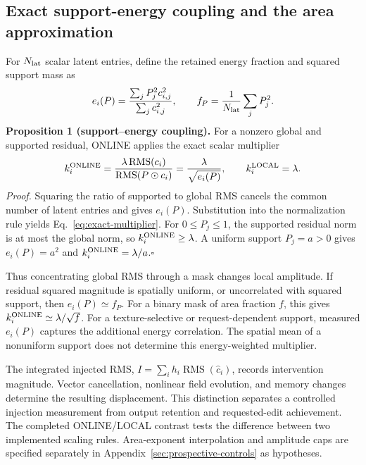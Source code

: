 \documentclass[conference]{IEEEtran}
\newcommand{\RMS}{\operatorname{RMS}}
\begin{document}
\subsection{Exact support-energy coupling and the area approximation}
For $N_{\rm lat}$ scalar latent entries, define the retained energy fraction and squared support mass as
\begin{equation}
 e_i(P)=\frac{\sum_j P_j^2c_{i,j}^2}{\sum_j c_{i,j}^2},\qquad
 f_P=\frac{1}{N_{\rm lat}}\sum_jP_j^2.
\label{eq:support-energy}
\end{equation}
\textbf{Proposition 1 (support--energy coupling).} For a nonzero global and supported residual, ONLINE applies the exact scalar multiplier
\begin{equation}
 k_i^{\rm ONLINE}=\frac{\lambda\RMS(c_i)}{\RMS(P\odot c_i)}=\frac{\lambda}{\sqrt{e_i(P)}},
 \qquad k_i^{\rm LOCAL}=\lambda.
\label{eq:exact-multiplier}
\end{equation}
\emph{Proof.} Squaring the ratio of supported to global RMS cancels the common number of latent entries and gives $e_i(P)$. Substitution into the normalization rule yields Eq.~\eqref{eq:exact-multiplier}. For $0\leq P_j\leq1$, the supported residual norm is at most the global norm, so $k_i^{\rm ONLINE}\geq\lambda$. A uniform support $P_j=a>0$ gives $e_i(P)=a^2$ and $k_i^{\rm ONLINE}=\lambda/a$.\hfill$\square$

Thus concentrating global RMS through a mask changes local amplitude. If residual squared magnitude is spatially uniform, or uncorrelated with squared support, then $e_i(P)\simeq f_P$. For a binary mask of area fraction $f$, this gives $k_i^{\rm ONLINE}\simeq \lambda/\sqrt f$. For a texture-selective or request-dependent support, measured $e_i(P)$ captures the additional energy correlation. The spatial mean of a nonuniform support does not determine this energy-weighted multiplier.

The integrated injected RMS, $I=\sum_i h_i\RMS(\widehat c_i)$, records intervention magnitude. Vector cancellation, nonlinear field evolution, and memory changes determine the resulting displacement. This distinction separates a controlled injection measurement from output retention and requested-edit achievement. The completed ONLINE/LOCAL contrast tests the difference between two implemented scaling rules. Area-exponent interpolation and amplitude caps are specified separately in Appendix~\ref{sec:prospective-controls} as hypotheses.
\end{document}
